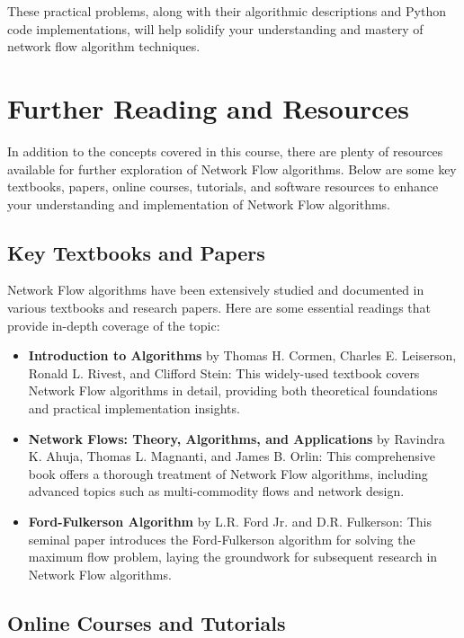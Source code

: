 \documentclass[12pt]{book} %
\begin{document}
These practical problems, along with their algorithmic descriptions and Python code implementations, will help solidify your understanding and mastery of network flow algorithm techniques.

\section{Further Reading and Resources}

In addition to the concepts covered in this course, there are plenty of resources available for further exploration of Network Flow algorithms. Below are some key textbooks, papers, online courses, tutorials, and software resources to enhance your understanding and implementation of Network Flow algorithms.

\subsection{Key Textbooks and Papers}

Network Flow algorithms have been extensively studied and documented in various textbooks and research papers. Here are some essential readings that provide in-depth coverage of the topic:

\begin{itemize}
    \item \textbf{Introduction to Algorithms} by Thomas H. Cormen, Charles E. Leiserson, Ronald L. Rivest, and Clifford Stein: This widely-used textbook covers Network Flow algorithms in detail, providing both theoretical foundations and practical implementation insights.
    \item \textbf{Network Flows: Theory, Algorithms, and Applications} by Ravindra K. Ahuja, Thomas L. Magnanti, and James B. Orlin: This comprehensive book offers a thorough treatment of Network Flow algorithms, including advanced topics such as multi-commodity flows and network design.
    \item \textbf{Ford-Fulkerson Algorithm} by L.R. Ford Jr. and D.R. Fulkerson: This seminal paper introduces the Ford-Fulkerson algorithm for solving the maximum flow problem, laying the groundwork for subsequent research in Network Flow algorithms.
\end{itemize}

\subsection{Online Courses and Tutorials}
\end{document}
